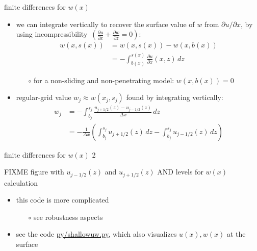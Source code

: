 \documentclass[10pt,dvipsnames]{beamer}
\begin{document}
\begin{frame}{finite differences for $w(x)$}

\begin{itemize}
\item we can integrate vertically to recover the surface value of $w$ from $\partial u/\partial x$, by \alert{using incompressibility} \,$\left(\frac{\partial u}{\partial x} + \frac{\partial w}{\partial z} = 0\right)$:
\begin{align*}
w(x,s(x)) &= w(x,s(x)) - w(x,b(x)) \\
   &= - \int_{b(x)}^{s(x)} \frac{\partial u}{\partial x}(x,z)\,dz
\end{align*}
  \begin{itemize}
  \item[$\circ$] for a non-sliding and non-penetrating model: $w(x,b(x))=0$
  \end{itemize}
\item regular-grid value $w_j \approx w(x_j,s_j)$ found by integrating vertically:
\begin{align*}
w_j &= - \int_{b_j}^{s_j} \frac{u_{j+1/2}(z) - u_{j-1/2}(z)}{\Delta x}\,dz \\
    &= - \frac{1}{\Delta x} \left(\int_{b_j}^{s_j} u_{j+1/2}(z)\,dz - \int_{b_j}^{s_j} u_{j-1/2}(z)\,dz\right)
\end{align*}
\end{itemize}
\end{frame}


\begin{frame}{finite differences for $w(x)$ 2}

\begin{center}
FIXME figure with $u_{j-1/2}(z)$ and $u_{j+1/2}(z)$ AND levels for $w(x)$ calculation
\end{center}

\begin{itemize}
\item this code is more complicated
  \begin{itemize}
  \item[$\circ$] see robustness aspects
  \end{itemize}
\item see the code \href{https://github.com/bueler/mccarthy/blob/master/py/shallowuw.py}{py/shallowuw.py}, which also visualizes $u(x),w(x)$ at the surface
\end{itemize}
\end{frame}
\end{document}
